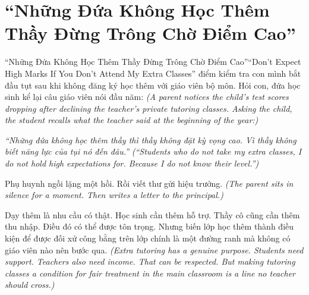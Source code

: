 \section{``Những Đứa Không Học Thêm Thầy Đừng Trông Chờ Điểm Cao''}
\begin{truyen}{``Những Đứa Không Học Thêm Thầy Đừng Trông Chờ Điểm Cao''}{``Don't Expect High Marks If You Don't Attend My Extra Classes''}
 điểm kiểm tra con mình bắt đầu tụt sau khi không đăng ký học thêm với giáo viên bộ môn. Hỏi con, đứa học sinh kể lại câu giáo viên nói đầu năm:
\textit{(A parent notices the child's test scores dropping after declining the teacher's private tutoring classes. Asking the child, the student recalls what the teacher said at the beginning of the year:)}

\textit{``Những đứa không học thêm thầy thì thầy không đặt kỳ vọng cao. Vì thầy không biết năng lực của tụi nó đến đâu.''}
\textit{(``Students who do not take my extra classes, I do not hold high expectations for. Because I do not know their level.'')}

Phụ huynh ngồi lặng một hồi. Rồi viết thư gửi hiệu trưởng.
\textit{(The parent sits in silence for a moment. Then writes a letter to the principal.)}

\begin{baihoc}
Dạy thêm là nhu cầu có thật. Học sinh cần thêm hỗ trợ. Thầy cô cũng cần thêm thu nhập. Điều đó có thể được tôn trọng. Nhưng biến lớp học thêm thành điều kiện để được đối xử công bằng trên lớp chính là một đường ranh mà không có giáo viên nào nên bước qua.
\textit{(Extra tutoring has a genuine purpose. Students need support. Teachers also need income. That can be respected. But making tutoring classes a condition for fair treatment in the main classroom is a line no teacher should cross.)}
\end{baihoc}
\end{truyen}

